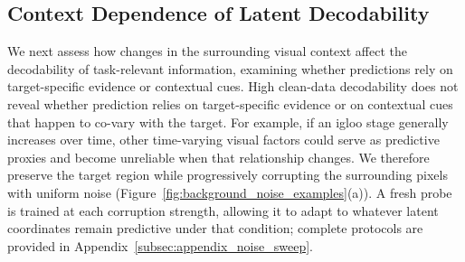 \documentclass{article} %
\begin{document}

\subsection{Context Dependence of Latent Decodability}
\label{subsec:context_dependence}

We next assess how changes in the surrounding visual context affect the decodability of task-relevant information, examining whether predictions rely on target-specific evidence or contextual cues. High clean-data decodability does not reveal whether prediction relies on target-specific evidence or on contextual cues that happen to co-vary with the target. For example, if an igloo stage generally increases over time, other time-varying visual factors could serve as predictive proxies and become unreliable when that relationship changes. We therefore preserve the target region while progressively
corrupting the surrounding pixels with uniform noise (Figure~\ref{fig:background_noise_examples}(a)). A fresh probe is trained at each corruption strength, allowing it to adapt to whatever latent coordinates remain predictive under that condition; complete protocols are provided in Appendix~\ref{subsec:appendix_noise_sweep}.
\end{document}
